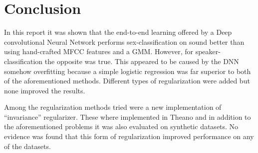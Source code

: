 \section{Conclusion}

In this report it was shown that the end-to-end learning offered by a Deep convolutional Neural Network performs sex-classification on sound better than using hand-crafted MFCC features and a GMM. However, for speaker-classification the opposite was true. This appeared to be caused by the DNN somehow overfitting  because a simple logistic regression was far superior to both of the aforementioned methods. Different types of regularization were added but none improved the results.

Among the regularization methods tried were a new implementation of ``invariance'' regularizer. These where implemented in Theano and in addition to the aforementioned problems it was also evaluated on synthetic datasets. No evidence was found that this form of regularization improved performance on any of the datasets.